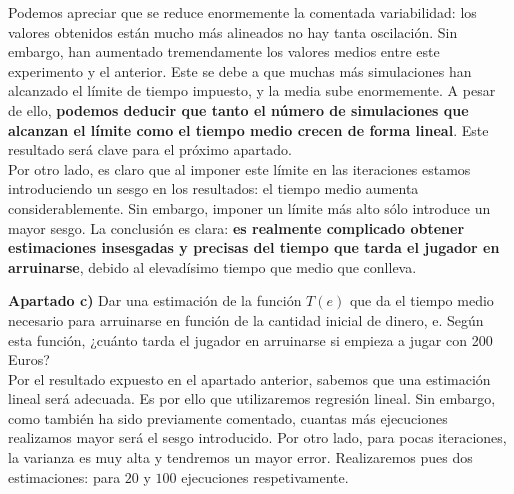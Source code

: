 \documentclass[a4paper]{article}
\begin{document}
Podemos apreciar que se reduce enormemente la comentada variabilidad: los valores obtenidos están mucho más alineados no hay tanta oscilación. Sin embargo, han aumentado tremendamente los valores medios entre este experimento y el anterior. Este se debe a que muchas más simulaciones han alcanzado el límite de tiempo impuesto, y la media sube enormemente. A pesar de ello, \textbf{podemos deducir que tanto el número de simulaciones que alcanzan el límite como el tiempo medio crecen de forma lineal}. Este resultado será clave para el próximo apartado. \\

Por otro lado, es claro que al imponer este límite en las iteraciones estamos introduciendo un sesgo en los resultados: el tiempo medio aumenta considerablemente. Sin embargo, imponer un límite más alto sólo introduce un mayor sesgo. La conclusión es clara: \textbf{es realmente complicado obtener estimaciones insesgadas y precisas del tiempo que tarda el jugador en arruinarse}, debido al elevadísimo tiempo que medio que conlleva.

\textbf{Apartado c)} Dar una estimación de la función $T(e)$ que da el tiempo medio necesario para arruinarse en función de la cantidad inicial de dinero, e. Según esta función, ¿cuánto tarda el jugador en arruinarse si empieza a jugar con 200 Euros? \\

Por el resultado expuesto en el apartado anterior, sabemos que una estimación lineal será adecuada. Es por ello que utilizaremos regresión lineal. Sin embargo, como también ha sido previamente comentado, cuantas más ejecuciones realizamos mayor será el sesgo introducido. Por otro lado, para pocas iteraciones, la varianza es muy alta y tendremos un mayor error. Realizaremos pues dos estimaciones: para $20$ y $100$ ejecuciones respetivamente.
\end{document}
